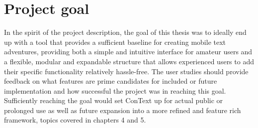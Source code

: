 \section{Project goal}
In the spirit of the project description, the goal of this thesis was to ideally end up with a tool that provides a sufficient baseline for creating mobile text adventures, providing both a simple and intuitive interface for amateur users and a flexible, modular and expandable structure that allows experienced users to add their specific functionality relatively hassle-free. 
The user studies should provide feedback on what features are prime candidates for included or future implementation and how successful the project was in reaching this goal. 
Sufficiently reaching the goal would set ConText up for actual public or prolonged use as well as future expansion into a more refined and feature rich framework, topics covered in chapters 4 and 5.





